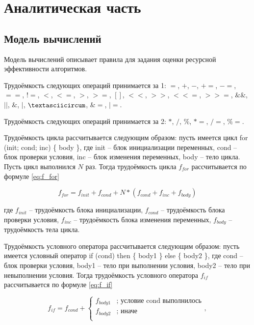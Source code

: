 \chapter{Аналитическая часть}


\section{Модель вычислений}

Модель вычислений описывает правила для задания оценки ресурсной эффективности алгоритмов.

Трудоёмкость следующих операций принимается за 1: $=$, $+$, $-$, $+=$, $-=$, $==$, $!=$, $<$, $<=$, $>$, $>=$, $[]$, $<<$, $>>$, $<<=$, $>>=$, $\&\&$, $||$, $\&$, $|$, $\textasciicircum$, $\&=$, $|=$. 

Трудоёмкость следующих операций принимается за 2: $*$, $/$, $\%$, $*=$, $/=$, $\%=$. 

Трудоёмкость цикла рассчитывается следующим образом: пусть имеется цикл for (init; cond; inc) \{ body \}, где init -- блок инициализации переменных, cond -- блок проверки условия, inc -- блок изменения переменных, body -- тело цикла. Пусть цикл выполнился $N$ раз. Тогда трудоёмкость цикла $f_{for}$ рассчитывается по формуле \ref{eq:f_for}

\begin{equation}
	\label{eq:f_for}
	f_{for} = f_{init} + f_{cond} + N * (f_{cond} + f_{inc} + f_{body})
\end{equation}

где $f_{init}$ -- трудоёмкость блока инициализации, $f_{cond}$ -- трудоёмкость блока проверки условия, $f_{inc}$ -- трудоёмкость блока изменения переменных, $ f_{body}$ -- трудоёмкость тела цикла.

Трудоёмкость условного оператора рассчитывается следующим образом: пусть имеется условный оператор if (cond) then \{ body1 \} else \{ body2 \}, где cond -- блок проверки условия, body1 -- тело при выполнении условия, body2 -- тело при невыполнении условия. Тогда трудоёмкость условного оператора $f_{if}$ рассчитывается по формуле \ref{eq:f_if}

\begin{equation}
	\label{eq:f_if}
	f_{if} = f_{cond} + \begin{cases}
		f_{body1} & \text{; условие cond выполнилось}\\
		f_{body2} & \text{; иначе}\\
	\end{cases},
\end{equation}

